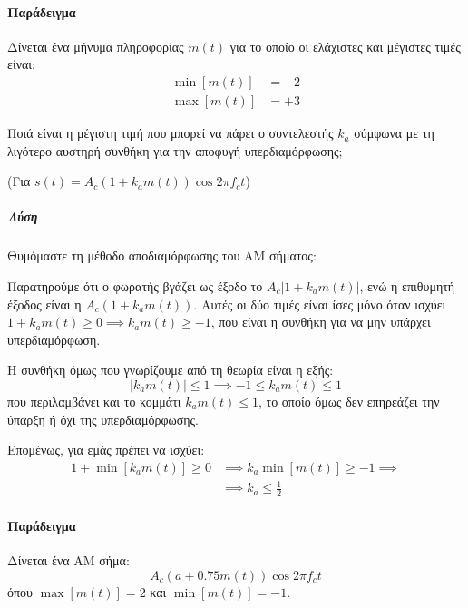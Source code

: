 \documentclass[11pt,a4paper,notitlepage,fleqn,final]{article}
\begin{document}
\paragraph{Παράδειγμα}
Δίνεται ένα μήνυμα πληροφορίας \( m(t) \) για το οποίο οι ελάχιστες και μέγιστες τιμές
είναι:
\begin{align*}
\min\left[m(t)\right] &= -2\\
\max\left[m(t)\right] &= +3
\end{align*}

Ποιά είναι η μέγιστη τιμή που μπορεί να πάρει ο συντελεστής \( k_a \) σύμφωνα με τη
λιγότερο αυστηρή συνθήκη για την αποφυγή υπερδιαμόρφωσης;

(Για \( s(t) = A_c(1+k_am(t)) \cos2πf_ct \))

\subparagraph{Λύση}

Θυμόμαστε τη μέθοδο αποδιαμόρφωσης του AM σήματος:


Παρατηρούμε ότι ο φωρατής βγάζει ως έξοδο το \( A_c\left|1+k_a m(t)\right| \),
ενώ η επιθυμητή έξοδος είναι η \( A_c\left(1+k_a m(t)\right) \). Αυτές οι δύο τιμές είναι
ίσες μόνο όταν ισχύει \( 1+k_a m(t) \geq 0 
\implies \boxed{k_am(t)} \geq -1 \), που είναι η συνθήκη για να μην υπάρχει
υπερδιαμόρφωση.

Η συνθήκη όμως που γνωρίζουμε από τη θεωρία είναι η εξής:
\[
\left| k_am(t) \right| \leq 1 \implies -1 \leq k_a m(t) \leq 1
\]
που περιλαμβάνει και το κομμάτι \( k_am(t) \leq 1 \), το οποίο όμως δεν επηρεάζει την
ύπαρξη ή όχι της υπερδιαμόρφωσης.

Επομένως, για εμάς πρέπει να ισχύει:
\begin{align*}
	1+\min\left[ k_am(t) \right] \geq 0 &\implies
	k_a\min\left[ m(t) \right] \geq -1 \implies \\ &\implies \boxed{
		k_a \leq \frac{1}{2}
		}
\end{align*}

\paragraph{Παράδειγμα}
Δίνεται ένα AM σήμα:
\[
A_c\left( a+0.75m(t) \right)\cos 2πf_c t
\]
όπου \( \max\left[m(t)\right] = 2 \) και \( \min\left[m(t)\right] = -1\).
\end{document}
